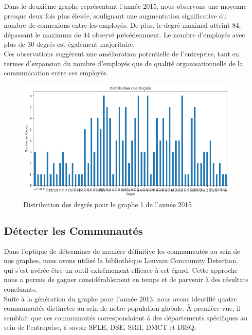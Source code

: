 \documentclass{article}
\begin{document}
Dans le deuxième graphe représentant l'année 2015, nous observons une moyenne presque deux fois plus élevée, soulignant une augmentation significative du nombre de connexions entre les employés. De plus, le degré maximal atteint 84, dépassant le maximum de 44 observé précédemment. Le nombre d'employés avec plus de 30 degrés est également majoritaire. \\

Ces observations suggèrent une amélioration potentielle de l'entreprise, tant en termes d'expansion du nombre d'employés que de qualité organisationnelle de la communication entre ces employés.

\clearpage
\newpage
\begin{figure}[!h]
    \centering
    \includegraphics[width=15cm]{assets/communaute/distribution_deg_2015}
    \caption{Distribution des degrés pour le graphe 1 de l'année 2015}
    \label{fig:distribution_deg_2015}
\end{figure}

\subsection{Détecter les Communautés}

Dans l'optique de déterminer de manière définitive les communautés au sein de nos graphes, nous avons utilisé la bibliothèque Louvain Community Detection, qui s'est avérée être un outil extrêmement efficace à cet égard. Cette approche nous a permis de gagner considérablement en temps et de parvenir à des résultats concluants. \\

Suite à la génération du graphe pour l'année 2013, nous avons identifié quatre communautés distinctes au sein de notre population globale. À première vue, il semblait que ces communautés correspondaient à des départements spécifiques au sein de l'entreprise, à savoir SFLE, DSE, SRH, DMCT et DISQ. \\
\end{document}
